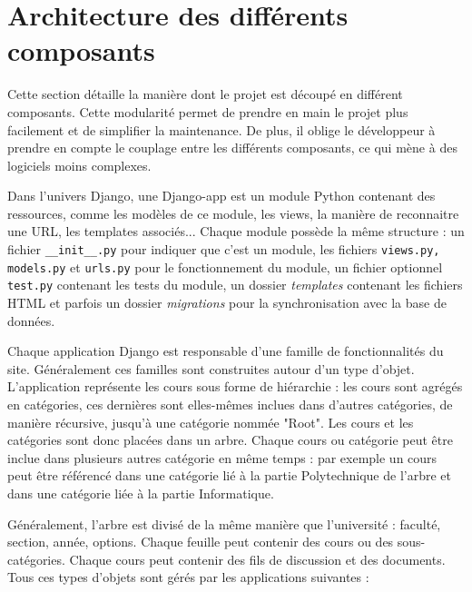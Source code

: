 \documentclass[a4paper,12pt]{article}
\begin{document}
\section{Architecture des différents composants}

Cette section détaille la manière dont le projet est découpé en différent
composants. Cette modularité permet de prendre en main le projet plus facilement
et de simplifier la maintenance. De plus, il oblige le développeur à
prendre en compte le couplage entre les différents composants, ce qui mène
à des logiciels moins complexes.

Dans l'univers Django, une Django-app est un module Python contenant des
ressources, comme les modèles de ce module, les views, la manière de reconnaitre
une URL, les templates associés... Chaque module possède la même structure : un fichier
\texttt{\_\_init\_\_.py} pour indiquer que c'est un module, les fichiers
\texttt{views.py, models.py} et \texttt{urls.py} pour le fonctionnement du module,
un fichier optionnel \texttt{test.py} contenant les tests du module, un dossier
\textit{templates} contenant les fichiers HTML et parfois un dossier \textit{migrations}
pour la synchronisation avec la base de données.

Chaque application Django est responsable d'une famille de fonctionnalités du site.
Généralement ces familles sont construites autour d'un type d'objet. L'application
représente les cours sous forme de hiérarchie : les cours sont agrégés en catégories,
ces dernières sont elles-mêmes inclues dans d'autres catégories, de manière récursive,
jusqu'à une catégorie nommée "Root". Les cours et les catégories sont donc
placées dans un arbre. Chaque cours ou catégorie peut être inclue dans plusieurs
autres catégorie en même temps : par exemple un cours peut être référencé dans
une catégorie lié à la partie Polytechnique de l'arbre et dans une catégorie liée à la
partie Informatique.

Généralement, l'arbre est divisé de la même manière que l'université : faculté,
section, année, options. Chaque feuille peut contenir des cours ou des sous-catégories.
Chaque cours peut contenir des fils de discussion et des documents. Tous ces
types d'objets sont gérés par les applications suivantes :
\end{document}
